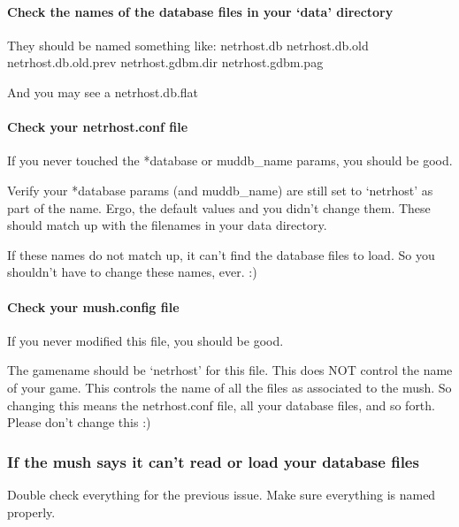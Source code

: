 \documentclass[letterpaper,10pt,english]{sphinxmanual}
\begin{document}
\paragraph{Check the names of the database files in your ‘data’ directory}
\label{\detokenize{troubleshooting:check-the-names-of-the-database-files-in-your-data-directory}}
\sphinxAtStartPar
They should be named something like:
netrhost.db
netrhost.db.old
netrhost.db.old.prev
netrhost.gdbm.dir
netrhost.gdbm.pag

\sphinxAtStartPar
And you may see a netrhost.db.flat


\paragraph{Check your netrhost.conf file}
\label{\detokenize{troubleshooting:check-your-netrhost-conf-file}}
\sphinxAtStartPar
If you never touched the *database or muddb\_name params, you should be good.

\sphinxAtStartPar
Verify your *database params (and muddb\_name) are still set to ‘netrhost’ as
part of the name.  Ergo, the default values and you didn’t change them.
These should match up with the filenames in your data directory.

\sphinxAtStartPar
If these names do not match up, it can’t find the database files to load.
So you shouldn’t have to change these names, ever. :)


\paragraph{Check your mush.config file}
\label{\detokenize{troubleshooting:check-your-mush-config-file}}
\sphinxAtStartPar
If you never modified this file, you should be good.

\sphinxAtStartPar
The gamename should be ‘netrhost’ for this file.  This does NOT control
the name of your game.  This controls the name of all the files
as associated to the mush.  So changing this means the netrhost.conf
file, all your database files, and so forth.  Please don’t change this :)


\subsubsection{If the mush says it can’t read or load your database files}
\label{\detokenize{troubleshooting:if-the-mush-says-it-can-t-read-or-load-your-database-files}}
\sphinxAtStartPar
Double check everything for the previous issue. Make sure everything is named properly.
\end{document}
